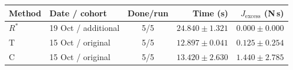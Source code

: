 \begin{tabular}{llcrr}
\toprule
Method & Date / cohort & Done/run & Time (s) & $J_{\mathrm{excess}}$ (N\,s) \\
\midrule
$R^{*}$ & 19 Oct / additional & 5/5 & $24.840 \pm 1.321$ & $0.000 \pm 0.000$ \\
T & 15 Oct / original & 5/5 & $12.897 \pm 0.041$ & $0.125 \pm 0.254$ \\
C & 15 Oct / original & 5/5 & $13.420 \pm 2.630$ & $1.440 \pm 2.785$ \\
\bottomrule
\end{tabular}

